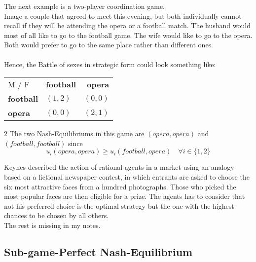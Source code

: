 \begin{example} \label{battleofthesexes} 
		The next example is a two-player coordination game. \\
		Image a couple that agreed to meet this evening, but both individually cannot recall if they will be attending the opera or a football match. The husband would most of all like to go to the football game. The wife would like to go to the opera. Both would prefer to go to the same place rather than different ones. \\ \\
		Hence, the Battle of sexes in strategic form could look something like:
		
		\begin{center}
			\begin{tabular}{|l|l|r|}
				\hline\hline
  					M / F & \textbf{football} & \textbf{opera} \\
         				\cline{1-3}
   					\textbf{football} & $(1, 2)$ & $(0, 0)$ 	\arrayrulewidth2pt \\
            			\cline{1-3}
   					\textbf{opera} & $(0, 0)$ & $(2, 1)$ \\ \hline\hline
			\end{tabular}	
		\end{center}
		2
		The two Nash-Equilibriums in this game are $(opera, opera)$ and $(football, football)$ since
		\[ u_{i}(opera, opera) \geq u_{i}(football, opera) \quad \forall i \in \{ 1, 2 \} \]
\end{example}

\begin{example} 
Keynes described the action of rational agents in a market using an analogy based on a fictional newspaper contest, in which entrants are asked to choose the six most attractive faces from a hundred photographs. Those who picked the most popular faces are then eligible for a prize. The agents has to consider that not his preferred choice is the optimal strategy but the one with the highest chances to be chosen by all others. \\

	The rest is missing in my notes. %
\end{example}

\subsection{Sub-game-Perfect Nash-Equilibrium}


